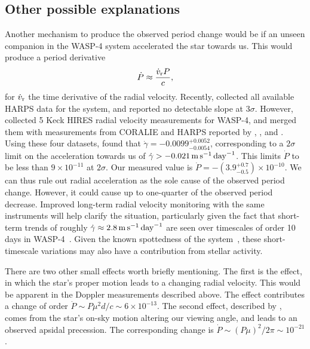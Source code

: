\documentclass[12pt,twocolumn,tighten]{aastex62}
\begin{document}
\subsection{Other possible explanations}

Another mechanism to produce the observed period change would be if an
unseen companion in the WASP-4 system accelerated the star towards us.
This would produce a period derivative
\begin{equation}
	\dot{P} \approx \frac{\dot{v}_{\rm r} P}{c},
\end{equation}
for $\dot{v}_{\rm r}$ the time derivative of the radial velocity.
Recently, \citet{bonomo_gaps_2017} collected all available HARPS data 
for the system, and reported no detectable slope at $3\sigma$.
However, \citet{knutson_friends_2014} collected 5 Keck HIRES radial velocity
measurements for WASP-4, and merged them with measurements from
CORALIE and HARPS reported by \citet{wilson_wasp-4b_2008},
\citet{pont_determining_2011}, and \citet{husnoo_observational_2012}.
Using these four datasets,
\citet{knutson_friends_2014} found that $\dot{\gamma} =
-0.0099^{+0.0052}_{-0.0054}$, corresponding to a $2\sigma$ limit on
the acceleration towards us of $\dot{\gamma} > - 0.021 \,{\rm m}\,{\rm
s}^{-1}\,{\rm day}^{-1}$.  This limits $\dot{P}$ to be less than
$9\times 10^{-11}$ at $2\sigma$.  
Our measured value is $\dot{P} =
-(3.9^{+0.7}_{-0.5})\times 10^{-10}$.  We can
thus rule out radial acceleration as the sole cause of the observed period
change.  However, it could cause up to one-quarter of the observed
period decrease.  Improved long-term radial velocity monitoring with
the same instruments will help clarify the situation, particularly
given the fact that short-term trends of roughly $\dot{\gamma} \approx
2.8 \,{\rm m}\,{\rm s}^{-1}\,{\rm day}^{-1}$ are seen over timescales
of order 10 days in WASP-4~\citep{husnoo_observational_2012}.
Given the known
spottedness of the system~\citep{sanchis-ojeda_starspots_2011}, these
short-timescale variations may also have a contribution from stellar
activity.

There are two other small effects worth briefly mentioning.  The
first is the \citet{shklovskii_possible_1970} effect, in which the
star's proper motion leads to a changing radial velocity.  This would be
apparent in the Doppler measurements described above.  The effect
contributes a change of order $\dot{P} \sim P\mu^2 d/ c \sim
6\times10^{-13}$.  The second effect, described by
\citet{rafikov_stellar_2009}, comes from the star's on-sky motion
altering our viewing angle, and leads to an observed apsidal precession.
The corresponding change is $\dot{P} \sim (P\mu)^2/2\pi \sim 10^{-21}$.
\end{document}
